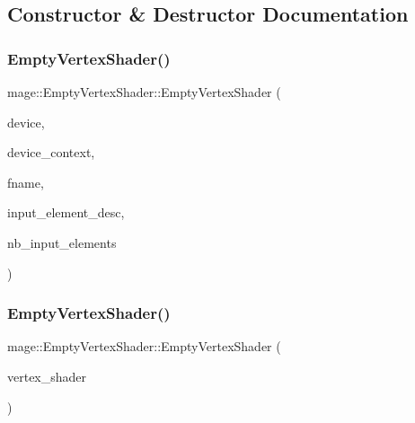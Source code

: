 \subsection{Constructor \& Destructor Documentation}
\hypertarget{classmage_1_1_empty_vertex_shader_a28fae401cf46242513144278dcd7f051}{}\label{classmage_1_1_empty_vertex_shader_a28fae401cf46242513144278dcd7f051} 
\subsubsection{\texorpdfstring{Empty\+Vertex\+Shader()}{EmptyVertexShader()}\hspace{0.1cm}{\footnotesize\ttfamily [1/3]}}
{\footnotesize\ttfamily mage\+::\+Empty\+Vertex\+Shader\+::\+Empty\+Vertex\+Shader (\begin{DoxyParamCaption}\item[{I\+D3\+D11\+Device2 $\ast$}]{device,  }\item[{I\+D3\+D11\+Device\+Context2 $\ast$}]{device\+\_\+context,  }\item[{const wstring \&}]{fname,  }\item[{const D3\+D11\+\_\+\+I\+N\+P\+U\+T\+\_\+\+E\+L\+E\+M\+E\+N\+T\+\_\+\+D\+E\+SC $\ast$}]{input\+\_\+element\+\_\+desc,  }\item[{uint32\+\_\+t}]{nb\+\_\+input\+\_\+elements }\end{DoxyParamCaption})\hspace{0.3cm}{\ttfamily [explicit]}}

\hypertarget{classmage_1_1_empty_vertex_shader_a6ab1b22d108fde8f8876e6a2e4c0decb}{}\label{classmage_1_1_empty_vertex_shader_a6ab1b22d108fde8f8876e6a2e4c0decb} 
\subsubsection{\texorpdfstring{Empty\+Vertex\+Shader()}{EmptyVertexShader()}\hspace{0.1cm}{\footnotesize\ttfamily [2/3]}}
{\footnotesize\ttfamily mage\+::\+Empty\+Vertex\+Shader\+::\+Empty\+Vertex\+Shader (\begin{DoxyParamCaption}\item[{const \hyperlink{classmage_1_1_empty_vertex_shader}{Empty\+Vertex\+Shader} \&}]{vertex\+\_\+shader }\end{DoxyParamCaption})\hspace{0.3cm}{\ttfamily [delete]}}

